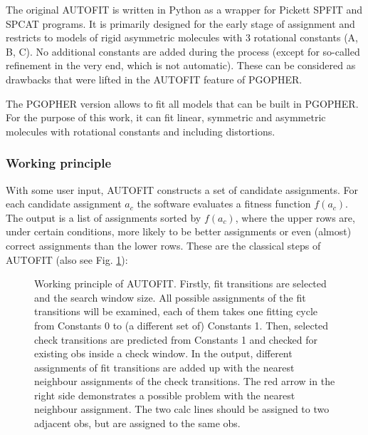 \documentclass[11pt]{article}
\begin{document}
The original AUTOFIT is written in Python as a wrapper for Pickett SPFIT and SPCAT programs. It is primarily designed for the early stage of assignment and restricts to models of rigid asymmetric molecules with 3 rotational constants (A, B, C).  No additional constants are added during the process (except for so-called refinement in the very end, which is not automatic). These can be considered as drawbacks that were lifted in the AUTOFIT feature of PGOPHER. 

The PGOPHER version allows to fit all models that can be built in PGOPHER. For the purpose of this work, it can fit linear, symmetric and asymmetric molecules with rotational constants and including distortions.

\subsubsection{Working principle}

With some user input, AUTOFIT constructs a set of candidate assignments. For each candidate assignment $a_c$ the software evaluates a fitness function $f(a_c)$. The output is a list of assignments sorted by $f(a_c)$, where the upper rows are, under certain conditions, more likely to be better assignments or even (almost) correct assignments than the lower rows. These are the classical steps of AUTOFIT (also see Fig. \ref{fig:autofit_pr}):

\begin{figure}[h]
\caption{\small Working principle of AUTOFIT. Firstly, fit transitions are selected and the search window size. All possible assignments of the fit transitions will be examined, each of them takes one fitting cycle from Constants 0 to (a different set of) Constants 1. Then, selected check transitions are predicted from Constants 1 and checked for existing obs inside a check window. In the output, different assignments of fit transitions are added up with the nearest neighbour assignments of the check transitions. The red arrow in the right side demonstrates a possible problem with the nearest neighbour assignment. The two calc lines should be assigned to two adjacent obs, but are assigned to the same obs.}
\label{fig:autofit_pr}
\end{figure}
\end{document}
